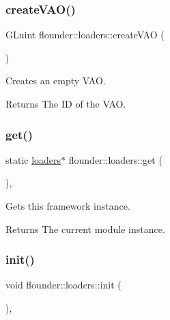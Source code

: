 \subsubsection{\texorpdfstring{create\+V\+A\+O()}{createVAO()}}
{\footnotesize\ttfamily G\+Luint flounder\+::loaders\+::create\+V\+AO (\begin{DoxyParamCaption}{ }\end{DoxyParamCaption})}



Creates an empty V\+AO. 

\begin{DoxyReturn}{Returns}
The ID of the V\+AO. 
\end{DoxyReturn}
\mbox{\label{classflounder_1_1loaders_ac57855261d2d43c545cac42e9efe981a}} 
\subsubsection{\texorpdfstring{get()}{get()}}
{\footnotesize\ttfamily static \hyperlink{classflounder_1_1loaders}{loaders}$\ast$ flounder\+::loaders\+::get (\begin{DoxyParamCaption}{ }\end{DoxyParamCaption})\hspace{0.3cm}{\ttfamily [inline]}, {\ttfamily [static]}}



Gets this framework instance. 

\begin{DoxyReturn}{Returns}
The current module instance. 
\end{DoxyReturn}
\mbox{\label{classflounder_1_1loaders_af99df6ebe1886b87efbca82842be0d0d}} 
\subsubsection{\texorpdfstring{init()}{init()}}
{\footnotesize\ttfamily void flounder\+::loaders\+::init (\begin{DoxyParamCaption}{ }\end{DoxyParamCaption})\hspace{0.3cm}{\ttfamily [override]}, {\ttfamily [virtual]}}



